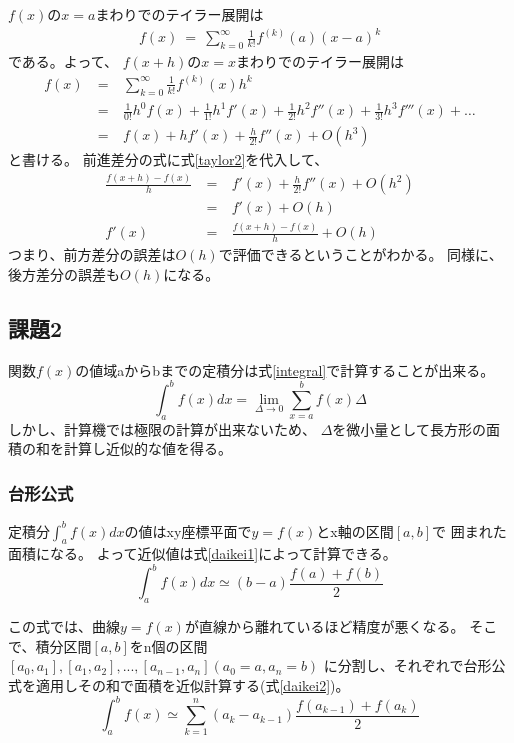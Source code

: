 \documentclass[dvipdfmx]{jsarticle}
\begin{document}
$f(x)$の$x=a$まわりでのテイラー展開は
\begin{eqnarray}
  f(x) ~=~ \sum_{k=0}^{\infty} \frac{1}{k!} f^{(k)}(a)(x-a)^k
  \label{taylor1}
\end{eqnarray}
である。よって、
$f(x+h)$の$x=x$まわりでのテイラー展開は
\begin{eqnarray}
  f(x) ~&=&~ \sum_{k=0}^{\infty} \frac{1}{k!} f^{(k)}(x)h^k \nonumber\\
  &=&~ \frac{1}{0!}h^0f(x) + \frac{1}{1!}h^1f'(x) + \frac{1}{2!}h^2f''(x) + \frac{1}{3!}h^3f'''(x) + \dots \nonumber\\
  &=&~ f(x) + hf'(x) + \frac{h}{2!}f''(x) + O(h^3)
  \label{taylor2}
\end{eqnarray}
と書ける。
前進差分の式に式\ref{taylor2}を代入して、
\begin{eqnarray}
  \frac{f(x+h)-f(x)}{h} ~&=&~ f'(x)+\frac{h}{2!}f''(x)+O(h^2) \\
  &=&~ f'(x) + O(h) \\
  f'(x) ~&=&~ \frac{f(x+h)-f(x)}{h}+O(h)
  \label{err1}
\end{eqnarray}
つまり、前方差分の誤差は$O(h)$で評価できるということがわかる。
同様に、後方差分の誤差も$O(h)$になる。

\subsection{課題2}

関数$f(x)$の値域aからbまでの定積分は式\ref{integral}で計算することが出来る。
\begin{equation}
  \int_a^b f(x) dx = \lim_{\Delta \to 0} \sum_{x=a}^{b} f(x) \Delta
  \label{integral}
\end{equation}
しかし、計算機では極限の計算が出来ないため、
$\Delta$を微小量として長方形の面積の和を計算し近似的な値を得る。

\subsubsection{台形公式}
定積分$\int_a^b f(x)dx$の値はxy座標平面で$y=f(x)$とx軸の区間$[a,b]$で
囲まれた面積になる。
よって近似値は式\ref{daikei1}によって計算できる。
\begin{equation}
  \int_a^b f(x)dx \simeq (b-a)\frac{f(a)+f(b)}{2}
  \label{daikei1}
\end{equation}

この式では、曲線$y=f(x)$が直線から離れているほど精度が悪くなる。
そこで、積分区間$[a,b]$をn個の区間$[a_0,a_1],[a_1,a_2],...,[a_{n-1},a_n] (a_0=a,a_n=b)$
に分割し、それぞれで台形公式を適用しその和で面積を近似計算する(式\ref{daikei2})。
\begin{equation}
  \int_a^b f(x) \simeq \sum_{k=1}^{n} (a_k-a_{k-1})\frac{f(a_{k-1})+f(a_k)}{2}
  \label{daikei2}
\end{equation}
\end{document}
